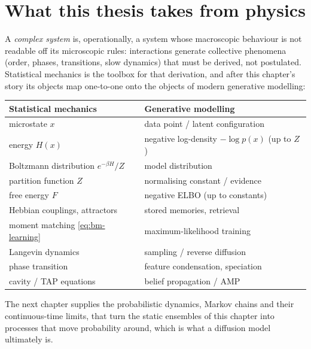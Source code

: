\section{What this thesis takes from physics}

A \emph{complex system} is, operationally, a system whose macroscopic
behaviour is not readable off its microscopic rules: interactions
generate collective phenomena (order, phases, transitions, slow dynamics)
that must be derived, not postulated. Statistical mechanics is the
toolbox for that derivation, and after this chapter's story its objects
map one-to-one onto the objects of modern generative modelling:
\begin{center}
\begin{tabular}{ll}
\toprule
\textbf{Statistical mechanics} & \textbf{Generative modelling} \\
\midrule
microstate $x$ & data point / latent configuration \\
energy $H(x)$ & negative log-density $-\log p(x)$ (up to $Z$) \\
Boltzmann distribution $e^{-\beta H}/Z$ & model distribution \\
partition function $Z$ & normalising constant / evidence \\
free energy $F$ & negative ELBO (up to constants) \\
Hebbian couplings, attractors & stored memories, retrieval \\
moment matching \eqref{eq:bm-learning} & maximum-likelihood training \\
Langevin dynamics & sampling / reverse diffusion \\
phase transition & feature condensation, speciation \\
cavity / TAP equations & belief propagation / AMP \\
\bottomrule
\end{tabular}
\end{center}
The next chapter supplies the probabilistic dynamics, Markov chains and
their continuous-time limits, that turn the static ensembles of this
chapter into processes that move probability around, which is what a
diffusion model ultimately is.
